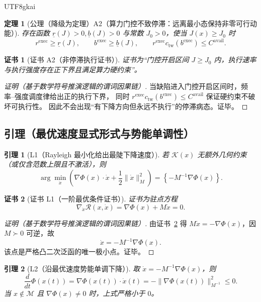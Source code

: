 \documentclass[12pt]{article}
\newtheorem{theorem}{定理}[section]
\newtheorem{lemma}{引理}[section]
\newtheorem{Certificate}{证书}[section]
\begin{document}
\begin{CJK*}{UTF8}{gkai}
\begin{theorem}[公理（降级为定理）A2（算力门控不致停滞：远离最小态保持非零可行动能）]
\label{thm:tex28-ch11-a2}
存在函数 $\underline r(J)>0,\underline b(J)>0$ 与常数 $J_0>0$，使当 $J(x)\ge J_0$ 时
\[
  r^{\mathrm{exec}}\ge \underline r(J),
  \qquad
  b^{\mathrm{exec}}\ge \underline b(J),
  \qquad
  r^{\mathrm{exec}}c_{\mathrm{tw}}(b^{\mathrm{exec}})\le C^{\mathrm{avail}}.
\]
\end{theorem}

\begin{Certificate}[证书 A2（非停滞执行证书）]
\label{cert:tex28-ch11-a2}
证书为“门控开启区间 $J\ge J_0$ 内，执行速率与执行强度存在正下界且满足算力硬约束”。
\end{Certificate}

\begin{proof}[证明（基于数学符号推演逻辑的谓词因果链）]
当缺陷进入门控开启区间时，频率--强度调度律给出正的执行下界，
同时 $r^{\mathrm{exec}}c_{\mathrm{tw}}(b^{\mathrm{exec}})\le C^{\mathrm{avail}}$ 保证硬约束不破坏可执行性。
因此不会出现“有下降方向但永远不执行”的停滞病态。证毕。
\end{proof}

\subsection{引理（最优速度显式形式与势能单调性）}
\label{subsec:tex28-ch11-lemmas}

\begin{lemma}[L1（Rayleigh 最小化给出最陡下降速度）]
\label{lem:tex28-ch11-l1}
若 $\mathcal{K}(x)$ 无额外几何约束（或仅含范数上限且不激活），则
\[
  \arg\min_{\dot x}\left(\nabla\Phi(x)\cdot\dot x+\frac12\|\dot x\|_M^2\right)
  =
  \left\{-M^{-1}\nabla\Phi(x)\right\}.
\]
\end{lemma}

\begin{Certificate}[证书 L1（一阶最优条件证书）]
\label{cert:tex28-ch11-l1}
证书为驻点方程
\[
  \nabla_{\dot x}\mathcal{R}(x,\dot x)=\nabla\Phi(x)+M\dot x=0.
\]
\end{Certificate}

\begin{proof}[证明（基于数学符号推演逻辑的谓词因果链）]
由证书~\ref{cert:tex28-ch11-l1} 得 $M\dot x=-\nabla\Phi(x)$，因 $M\succ0$ 可逆，故
\[
  \dot x=-M^{-1}\nabla\Phi(x).
\]
该点是严格凸二次泛函的唯一极小点。证毕。
\end{proof}

\begin{lemma}[L2（沿最优速度势能单调下降）]
\label{lem:tex28-ch11-l2}
取 $\dot x=-M^{-1}\nabla\Phi(x)$，则
\[
  \frac{d}{dt}\Phi(x(t))
  =\nabla\Phi(x(t))\cdot\dot x(t)
  =-\|\nabla\Phi(x(t))\|_{M^{-1}}^2
  \le 0.
\]
当 $x\notin\mathcal{M}$ 且 $\nabla\Phi(x)\neq 0$ 时，上式严格小于 $0$。
\end{lemma}


\end{CJK*}
\end{document}
